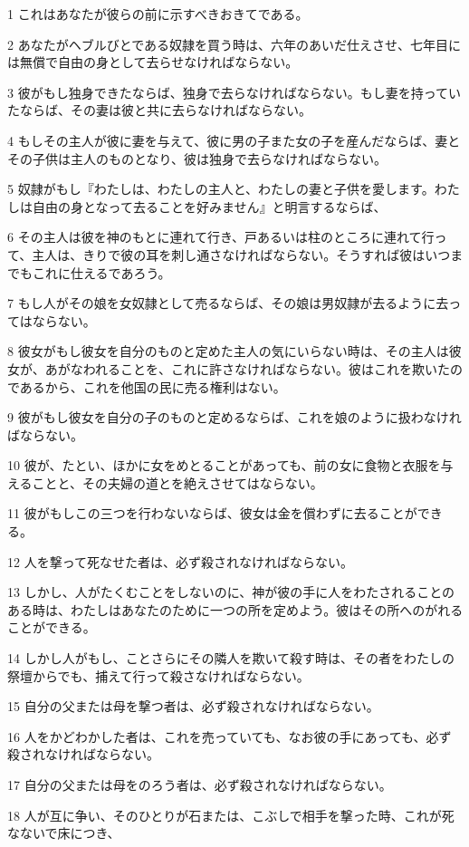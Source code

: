 \par 1 これはあなたが彼らの前に示すべきおきてである。
\par 2 あなたがヘブルびとである奴隷を買う時は、六年のあいだ仕えさせ、七年目には無償で自由の身として去らせなければならない。
\par 3 彼がもし独身できたならば、独身で去らなければならない。もし妻を持っていたならば、その妻は彼と共に去らなければならない。
\par 4 もしその主人が彼に妻を与えて、彼に男の子また女の子を産んだならば、妻とその子供は主人のものとなり、彼は独身で去らなければならない。
\par 5 奴隷がもし『わたしは、わたしの主人と、わたしの妻と子供を愛します。わたしは自由の身となって去ることを好みません』と明言するならば、
\par 6 その主人は彼を神のもとに連れて行き、戸あるいは柱のところに連れて行って、主人は、きりで彼の耳を刺し通さなければならない。そうすれば彼はいつまでもこれに仕えるであろう。
\par 7 もし人がその娘を女奴隷として売るならば、その娘は男奴隷が去るように去ってはならない。
\par 8 彼女がもし彼女を自分のものと定めた主人の気にいらない時は、その主人は彼女が、あがなわれることを、これに許さなければならない。彼はこれを欺いたのであるから、これを他国の民に売る権利はない。
\par 9 彼がもし彼女を自分の子のものと定めるならば、これを娘のように扱わなければならない。
\par 10 彼が、たとい、ほかに女をめとることがあっても、前の女に食物と衣服を与えることと、その夫婦の道とを絶えさせてはならない。
\par 11 彼がもしこの三つを行わないならば、彼女は金を償わずに去ることができる。
\par 12 人を撃って死なせた者は、必ず殺されなければならない。
\par 13 しかし、人がたくむことをしないのに、神が彼の手に人をわたされることのある時は、わたしはあなたのために一つの所を定めよう。彼はその所へのがれることができる。
\par 14 しかし人がもし、ことさらにその隣人を欺いて殺す時は、その者をわたしの祭壇からでも、捕えて行って殺さなければならない。
\par 15 自分の父または母を撃つ者は、必ず殺されなければならない。
\par 16 人をかどわかした者は、これを売っていても、なお彼の手にあっても、必ず殺されなければならない。
\par 17 自分の父または母をのろう者は、必ず殺されなければならない。
\par 18 人が互に争い、そのひとりが石または、こぶしで相手を撃った時、これが死なないで床につき、
